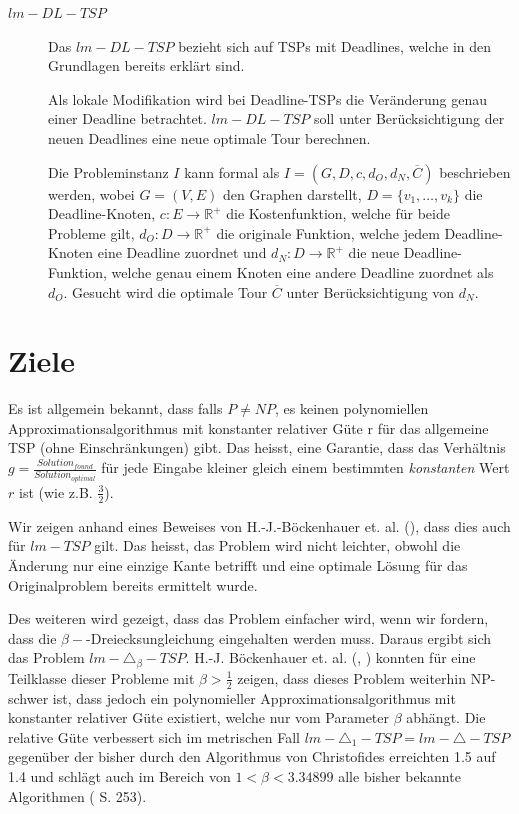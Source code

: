 \documentclass[a4paper,11pt]{scrreprt}
\begin{document}
\begin{description}
\item[$lm-DL-TSP$]

Das $lm-DL-TSP$ bezieht sich auf TSPs mit Deadlines, welche in den Grundlagen bereits erklärt sind.

Als lokale Modifikation wird bei Deadline-TSPs die Veränderung genau einer Deadline betrachtet. $lm-DL-TSP$ soll unter Berücksichtigung der neuen Deadlines eine neue optimale Tour berechnen.

Die Probleminstanz $I$ kann formal als $I = (G, D, c, d_O, d_N, \overline{C})$ beschrieben werden, wobei $G = (V, E)$ den Graphen darstellt, $D = \{v_1, \dots, v_k \}$ die Deadline-Knoten, $c: E \rightarrow \mathbb{R}^+$ die Kostenfunktion, welche für beide Probleme gilt, $d_O: D \rightarrow \mathbb{R}^+$ die originale Funktion, welche jedem Deadline-Knoten eine Deadline zuordnet und $d_N: D \rightarrow \mathbb{R}^+$ die neue Deadline-Funktion, welche genau einem Knoten eine andere Deadline zuordnet als $d_O$. Gesucht wird die optimale Tour $\overline{C}$ unter Berücksichtigung von $d_N$.

\end{description}

\section{Ziele}

Es ist allgemein bekannt, dass falls $P \not= NP$, es keinen polynomiellen Approximationsalgorithmus mit konstanter relativer Güte r für das allgemeine TSP (ohne Einschränkungen) gibt. Das heisst, eine Garantie, dass das Verhältnis $g = \frac{Solution_{found}}{Solution_{optimal}}$ für jede Eingabe kleiner gleich einem bestimmten \emph{konstanten} Wert $r$ ist (wie z.B. $\frac{3}{2}$).

Wir zeigen anhand eines Beweises von H.-J.-Böckenhauer et. al. (\cite{bok1}), dass dies auch für $lm-TSP$ gilt. Das heisst, das Problem wird nicht leichter, obwohl die Änderung nur eine einzige Kante betrifft und eine optimale Lösung für das Originalproblem bereits ermittelt wurde.

Des weiteren wird gezeigt, dass das Problem einfacher wird, wenn wir fordern, dass die $\beta-$-Dreiecksungleichung eingehalten werden muss. Daraus ergibt sich das Problem $lm-\triangle_\beta-TSP$. H.-J. Böckenhauer et. al. (\cite{bok1}, \cite{bok2}) konnten für eine Teilklasse dieser Probleme mit $\beta > \frac{1}{2}$ zeigen, dass dieses Problem weiterhin NP-schwer ist, dass jedoch ein polynomieller Approximationsalgorithmus mit konstanter relativer Güte existiert, welche nur vom Parameter $\beta$ abhängt. Die relative Güte verbessert sich im metrischen Fall $lm-\triangle_1-TSP = lm-\triangle-TSP$ gegenüber der bisher durch den Algorithmus von Christofides erreichten 1.5 auf 1.4 und schlägt auch im Bereich von $1 < \beta < 3.34899$ alle bisher bekannte Algorithmen (\cite{bok1} S. 253).
\end{document}
